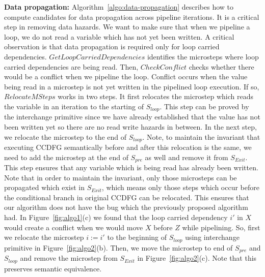 {\bf Data propagation:} Algorithm~\ref{algo:data-propagation} describes how to compute candidates for data
propagation across pipeline iterations. It is a critical step in removing data hazards. We want to make sure that when we pipeline a loop, we do not read a variable which has not
yet been written. A critical observation is that data propagation is required only for loop carried dependencies.
$GetLoopCarriedDependencies$ identifies the microsteps where loop carried dependencies are being read. Then,
$CheckConflict$ checks whether there would be a conflict when we pipeline the loop.
Conflict occurs when the value being read in a microstep is not yet written in the pipelined loop execution. If so, $RelocateMSteps$ works in two steps. It first relocates the microstep which reads the variable in an iteration to the starting of $S_{loop}$. This step can be proved by the interchange primitive since we have already established that the value has not been written yet so there are no read write hazards in between. In the next step, we relocate the microstep to the end of $S_{loop}$. Note, to maintain the invariant that executing CCDFG semantically before and after this relocation is the same, we need to add the microstep at the end of $S_{pre}$ as well and remove it from $S_{Exit}$. This step ensures that any variable which is being read has already been written. Note that in order to maintain the invariant, only those microsteps can be propagated which exist in $S_{Exit}$, which means only those steps which occur before the conditional branch in original CCDFG can be relocated. This ensures that our algorithm does not have the bug which the previously proposed algorithm had.
In Figure~\ref{fig:algo1}(c) we found that the loop carried dependency $i'$ in $X$ would create a conflict when we would move $X$ before $Z$ while pipelining. So, first we relocate the microstep $i := i'$ to the beginning of $S_{loop}$ using interchange primitive in Figure~\ref{fig:algo2}(b). Then, we move the microstep to end of $S_{pre}$ and $S_{loop}$ and remove the microstep from $S_{Exit}$ in  Figure~\ref{fig:algo2}(c). Note that this preserves semantic equivalence.




